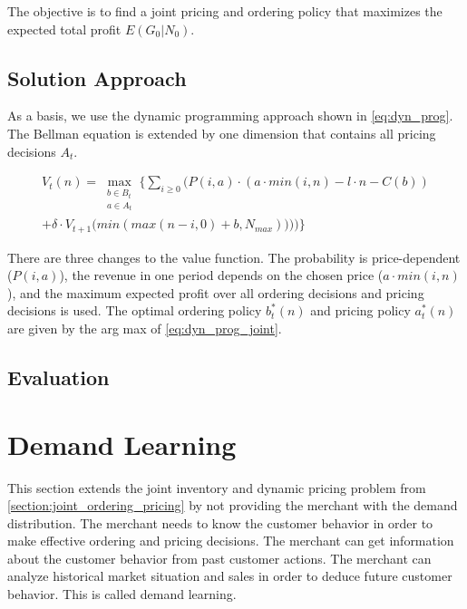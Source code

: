 The objective is to find a joint pricing and ordering policy that maximizes the expected total profit $E(G_0 | N_0)$.

\subsection{Solution Approach}
\label{section:joint_solution}
As a basis, we use the dynamic programming approach shown in \cref{eq:dyn_prog}.
The Bellman equation is extended by one dimension that contains all pricing decisions $A_t$.

\begin{equation}
\begin{split}
V_t(n) = \max_{\substack{b \in B_t \\ a \in A_t}} \Bigg\{
\sum_{i \geq 0} \Big(
P(i, a) \cdot (
a \cdot min(i, n) %
- l \cdot n %
- C(b) %
) \\
+ \delta \cdot V_{t+1}\big(min(max(n - i, 0) + b, N_{max}))\big)
\Big)\Bigg\}
\end{split}
\label{eq:dyn_prog_joint}
\end{equation}

There are three changes to the value function.
The probability is price-dependent ($P(i, a)$), the revenue in one period depends on the chosen price ($a \cdot min(i, n)$), and the maximum expected profit over all ordering decisions and pricing decisions is used.
The optimal ordering policy $b^*_t(n)$ and pricing policy $a^*_t(n)$ are given by the arg max of \cref{eq:dyn_prog_joint}.

\subsection{Evaluation}

\section{Demand Learning}
\label{section:demand_learning}

This section extends the joint inventory and dynamic pricing problem from \cref{section:joint_ordering_pricing} by not providing the merchant with the demand distribution.
The merchant needs to know the customer behavior in order to make effective ordering and pricing decisions.
The merchant can get information about the customer behavior from past customer actions.
The merchant can analyze historical market situation and sales in order to deduce future customer behavior.
This is called demand learning.

